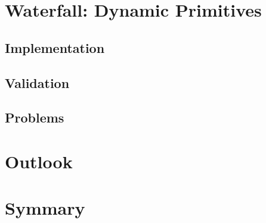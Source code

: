 \section{Waterfall: Dynamic Primitives}
\subsection{Implementation}

\subsection{Validation}

\subsection{Problems}


\section{Outlook}


\section{Symmary}


